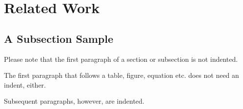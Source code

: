 \section{Related Work}
\subsection{A Subsection Sample}
Please note that the first paragraph of a section or subsection is not indented. 

The first paragraph that follows a table, figure,
equation etc. does not need an indent, either.

Subsequent paragraphs, however, are indented.\cite{luo2020dream}
